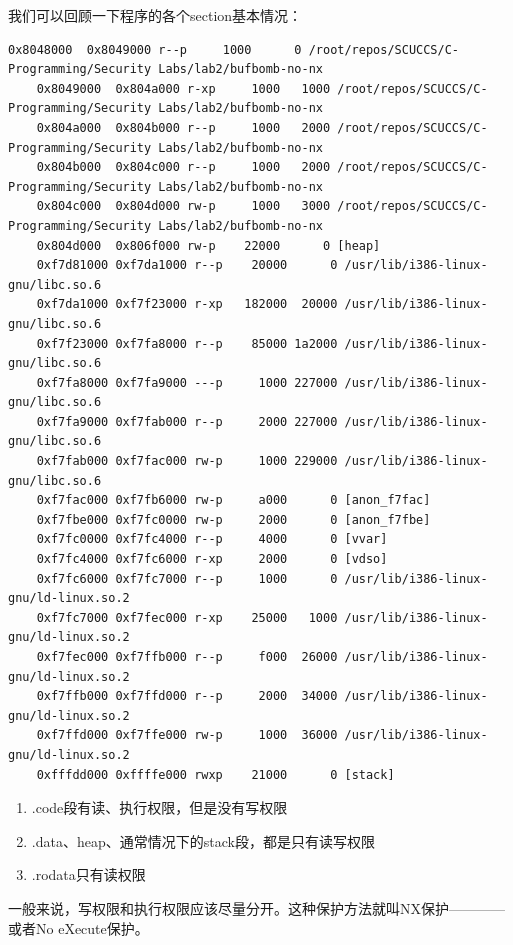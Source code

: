 \documentclass[a4pper,12pt,onecolumn]{article}
\begin{document}
我们可以回顾一下程序的各个section基本情况：

\begin{lstlisting}[style=DOS]
    0x8048000  0x8049000 r--p     1000      0 /root/repos/SCUCCS/C-Programming/Security Labs/lab2/bufbomb-no-nx
    0x8049000  0x804a000 r-xp     1000   1000 /root/repos/SCUCCS/C-Programming/Security Labs/lab2/bufbomb-no-nx
    0x804a000  0x804b000 r--p     1000   2000 /root/repos/SCUCCS/C-Programming/Security Labs/lab2/bufbomb-no-nx
    0x804b000  0x804c000 r--p     1000   2000 /root/repos/SCUCCS/C-Programming/Security Labs/lab2/bufbomb-no-nx
    0x804c000  0x804d000 rw-p     1000   3000 /root/repos/SCUCCS/C-Programming/Security Labs/lab2/bufbomb-no-nx
    0x804d000  0x806f000 rw-p    22000      0 [heap]
    0xf7d81000 0xf7da1000 r--p    20000      0 /usr/lib/i386-linux-gnu/libc.so.6
    0xf7da1000 0xf7f23000 r-xp   182000  20000 /usr/lib/i386-linux-gnu/libc.so.6
    0xf7f23000 0xf7fa8000 r--p    85000 1a2000 /usr/lib/i386-linux-gnu/libc.so.6
    0xf7fa8000 0xf7fa9000 ---p     1000 227000 /usr/lib/i386-linux-gnu/libc.so.6
    0xf7fa9000 0xf7fab000 r--p     2000 227000 /usr/lib/i386-linux-gnu/libc.so.6
    0xf7fab000 0xf7fac000 rw-p     1000 229000 /usr/lib/i386-linux-gnu/libc.so.6
    0xf7fac000 0xf7fb6000 rw-p     a000      0 [anon_f7fac]
    0xf7fbe000 0xf7fc0000 rw-p     2000      0 [anon_f7fbe]
    0xf7fc0000 0xf7fc4000 r--p     4000      0 [vvar]
    0xf7fc4000 0xf7fc6000 r-xp     2000      0 [vdso]
    0xf7fc6000 0xf7fc7000 r--p     1000      0 /usr/lib/i386-linux-gnu/ld-linux.so.2
    0xf7fc7000 0xf7fec000 r-xp    25000   1000 /usr/lib/i386-linux-gnu/ld-linux.so.2
    0xf7fec000 0xf7ffb000 r--p     f000  26000 /usr/lib/i386-linux-gnu/ld-linux.so.2
    0xf7ffb000 0xf7ffd000 r--p     2000  34000 /usr/lib/i386-linux-gnu/ld-linux.so.2
    0xf7ffd000 0xf7ffe000 rw-p     1000  36000 /usr/lib/i386-linux-gnu/ld-linux.so.2
    0xfffdd000 0xffffe000 rwxp    21000      0 [stack]
\end{lstlisting}

\begin{enumerate}
    \item .code段有读、执行权限，但是没有写权限
    \item .data、heap、通常情况下的stack段，都是只有读写权限
    \item .rodata只有读权限
\end{enumerate}

一般来说，写权限和执行权限应该尽量分开。这种保护方法就叫NX保护————或者No eXecute保护。
\end{document}
